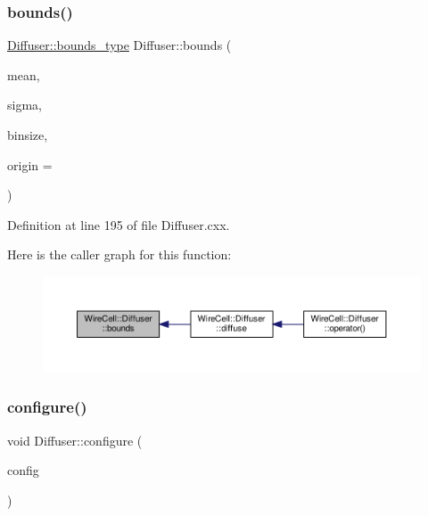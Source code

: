 \subsubsection{\texorpdfstring{bounds()}{bounds()}}
{\footnotesize\ttfamily \hyperlink{class_wire_cell_1_1_diffuser_a5ec949c1c222b25d1db6542dacc6d983}{Diffuser\+::bounds\+\_\+type} Diffuser\+::bounds (\begin{DoxyParamCaption}\item[{double}]{mean,  }\item[{double}]{sigma,  }\item[{double}]{binsize,  }\item[{double}]{origin = {} }\end{DoxyParamCaption})}



Definition at line 195 of file Diffuser.\+cxx.

Here is the caller graph for this function\+:
\nopagebreak
\begin{figure}[H]
\begin{center}
\leavevmode
\includegraphics[width=350pt]{class_wire_cell_1_1_diffuser_a2b37e9c8a8e88697620fda6acb8ef3b1_icgraph}
\end{center}
\end{figure}
\mbox{\label{class_wire_cell_1_1_diffuser_a494d8aa964610d4b129f4305630491f6}} 
\subsubsection{\texorpdfstring{configure()}{configure()}}
{\footnotesize\ttfamily void Diffuser\+::configure (\begin{DoxyParamCaption}\item[{const \hyperlink{namespace_wire_cell_a9f705541fc1d46c608b3d32c182333ee}{Wire\+Cell\+::\+Configuration} \&}]{config }\end{DoxyParamCaption})\hspace{0.3cm}{\ttfamily [virtual]}}




